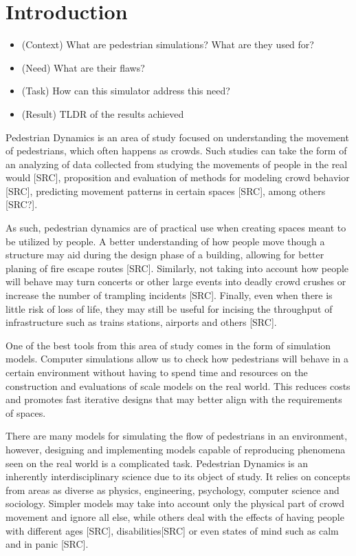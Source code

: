 \documentclass[twoside, 11pt]{article}
\begin{document}
 
\newpage


\mainmatter

\section{Introduction}

\begin{itemize}
  \item (Context) What are pedestrian simulations? What are they used for?
  \item (Need) What are their flaws?
  \item (Task) How can this simulator address this need?
  \item (Result) TLDR of the results achieved
\end{itemize}

Pedestrian Dynamics is an area of study focused on understanding the movement of pedestrians, which often happens as crowds. Such studies can take the form of an analyzing of data collected from studying the movements of people in the real would [SRC], proposition and evaluation of methods for modeling crowd behavior [SRC], predicting movement patterns in certain spaces [SRC], among others [SRC?].

As such, pedestrian dynamics are of practical use when creating spaces meant to be utilized by people. A better understanding of how people move though a structure may aid during the design phase of a building, allowing for better planing of fire escape routes [SRC]. Similarly, not taking into account how people will behave may turn concerts or other large events into deadly crowd crushes or increase the number of trampling incidents [SRC]. Finally, even when there is little risk of loss of life, they may still be useful for incising the throughput of infrastructure such as trains stations, airports and others [SRC].

One of the best tools from this area of study comes in the form of simulation models. Computer simulations allow us to check how pedestrians will behave in a certain environment without having to spend time and resources on the construction and evaluations of scale models on the real world. This reduces costs and promotes fast iterative designs that may better align with the requirements of spaces.

There are many models for simulating the flow of pedestrians in an environment, however, designing and implementing models capable of reproducing phenomena seen on the real world is a complicated task. Pedestrian Dynamics is an inherently interdisciplinary science due to its object of study. It relies on concepts from areas as diverse as physics, engineering, psychology, computer science and sociology. Simpler models may take into account only the physical part of crowd movement and ignore all else, while others deal with the effects of having people with different ages [SRC], disabilities[SRC] or even states of mind such as calm and in panic [SRC].
\end{document}
